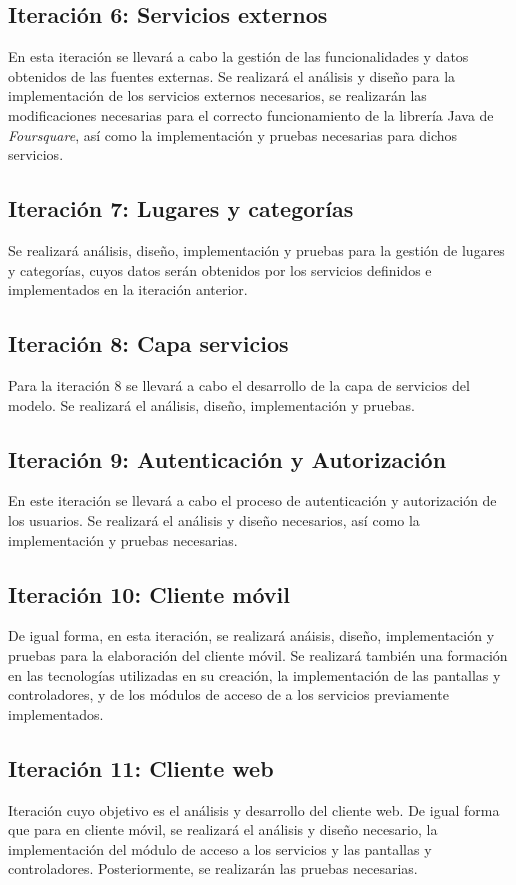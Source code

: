 \subsection{Iteración 6: Servicios externos}
En esta iteración se llevará a cabo la gestión de las funcionalidades y datos obtenidos de las fuentes externas. Se realizará el análisis y diseño para la implementación de los servicios externos necesarios, se realizarán las modificaciones necesarias para el correcto funcionamiento de la librería Java de \textit{Foursquare}, así como la implementación y pruebas necesarias para dichos servicios.


\subsection{Iteración 7: Lugares y categorías}
Se realizará análisis, diseño, implementación y pruebas para la gestión de lugares y categorías, cuyos datos serán obtenidos por los servicios definidos e implementados en la iteración anterior.


\subsection{Iteración 8: Capa servicios}
Para la iteración 8 se llevará a cabo el desarrollo de la capa de servicios del modelo. Se realizará el análisis, diseño, implementación y pruebas.


\subsection{Iteración 9: Autenticación y Autorización}
En este iteración se llevará a cabo el proceso de autenticación y autorización de los usuarios. Se realizará el análisis y diseño necesarios, así como la implementación y pruebas necesarias.


\subsection{Iteración 10: Cliente móvil}
De igual forma, en esta iteración, se realizará anáisis, diseño, implementación y pruebas para la elaboración del cliente móvil. Se realizará también una formación en las tecnologías utilizadas en su creación, la implementación de las pantallas y controladores, y de los módulos de acceso de a los servicios previamente implementados.


\subsection{Iteración 11: Cliente web}
Iteración cuyo objetivo es el análisis y desarrollo del cliente web. De igual forma que para en cliente móvil, se realizará el análisis y diseño necesario, la implementación del módulo de acceso a los servicios y las pantallas y controladores. Posteriormente, se realizarán las pruebas necesarias.


